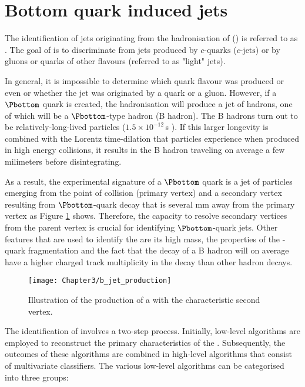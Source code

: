 \section{Bottom quark induced jets}
\label{sec:Chap3:Reco:Bjets}
The identification of jets originating from the hadronisation of \bquarks (\bjets) is referred to as \btag. 
The goal of \btag is to discriminate \bjets from jets produced by \ensuremath{c\text{-quarks}} (\ensuremath{c\text{-jets}}) 
or by gluons or quarks of other flavours (referred to as "light" jets). 

In general, it is impossible to determine which quark flavour was produced or even or whether the jet was
originated by a quark or a gluon. However, if a $\Pbottom$ quark is created, the hadronisation will produce
a jet of hadrons, one of which will be a $\Pbottom$-type hadron (B hadron). The B hadrons turn out to be 
relatively-long-lived particles ($1.5 \times 10^{-12}\,$s \cite{Workman:2022ynf}). If this larger longevity is combined with the Lorentz 
time-dilation that particles experience when produced in high energy collisions, it results in the B hadron 
traveling on average a few milimeters before disintegrating.  

As a result, the experimental signature of a $\Pbottom$ quark is a jet of particles emerging from the point of
collision (primary vertex) and a secondary vertex resulting from $\Pbottom$-quark decay that is several mm 
away from the primary vertex as Figure \ref{fig:Chap3:b_jet_production} shows. 
Therefore, the capacity to resolve secondary vertices from the parent vertex is
crucial for identifying $\Pbottom$-quark jets. Other features that are used to identify the \bjets are its high mass,
the properties of the \Pbottom-quark fragmentation and the fact that the decay of
a B hadron will on average have a higher charged track multiplicity in the decay 
than other hadron decays.

\begin{figure}
	\centering
 	 \texttt{[image: Chapter3/b\_jet\_production]}
	 \caption{Illustration of the production of a \bjet with the characteristic 
	 second vertex\cite{Connelly:2017wlp}.}
	\label{fig:Chap3:b_jet_production}
\end{figure}

The identification of \bjets involves a two-step process. Initially, low-level algorithms 
are employed to reconstruct the primary characteristics of the \bjets. Subsequently, 
the outcomes of these algorithms are combined in high-level algorithms that consist 
of multivariate classifiers. The various low-level algorithms can be categorised into 
three groups:

